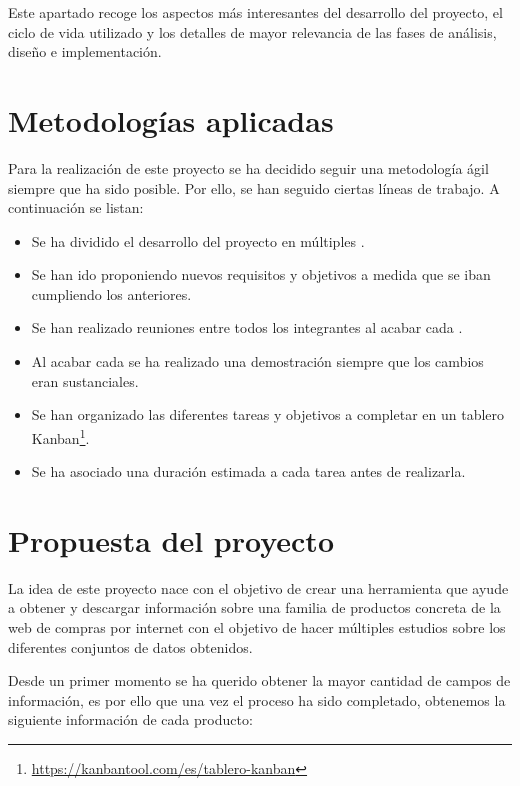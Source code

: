 
Este apartado recoge los aspectos más interesantes del desarrollo del proyecto, el ciclo de vida utilizado y los detalles de mayor relevancia de las fases de análisis, diseño e implementación.

\section{Metodologías aplicadas}

Para la realización de este proyecto se ha decidido seguir una metodología ágil siempre que ha sido posible. Por ello, se han seguido ciertas líneas de trabajo. A continuación se listan:

\begin{itemize}
    \item Se ha dividido el desarrollo del proyecto en múltiples .
    \item Se han ido proponiendo nuevos requisitos y objetivos a medida que se iban cumpliendo los anteriores.
    \item Se han realizado reuniones entre todos los integrantes al acabar cada .
    \item Al acabar cada  se ha realizado una demostración siempre que los cambios eran sustanciales.
    \item Se han organizado las diferentes tareas y objetivos a completar en un tablero Kanban\footnote{\url{https://kanbantool.com/es/tablero-kanban}}.
    \item Se ha asociado una duración estimada a cada tarea antes de realizarla.
\end{itemize}

\section{Propuesta del proyecto}
La idea de este proyecto nace con el objetivo de crear una herramienta que ayude a obtener y descargar información sobre una familia de productos concreta de la web de compras por internet  con el objetivo de hacer múltiples estudios sobre los diferentes conjuntos de datos obtenidos.

Desde un primer momento se ha querido obtener la mayor cantidad de campos de información, es por ello que una vez el proceso ha sido completado, obtenemos la siguiente información de cada producto:

